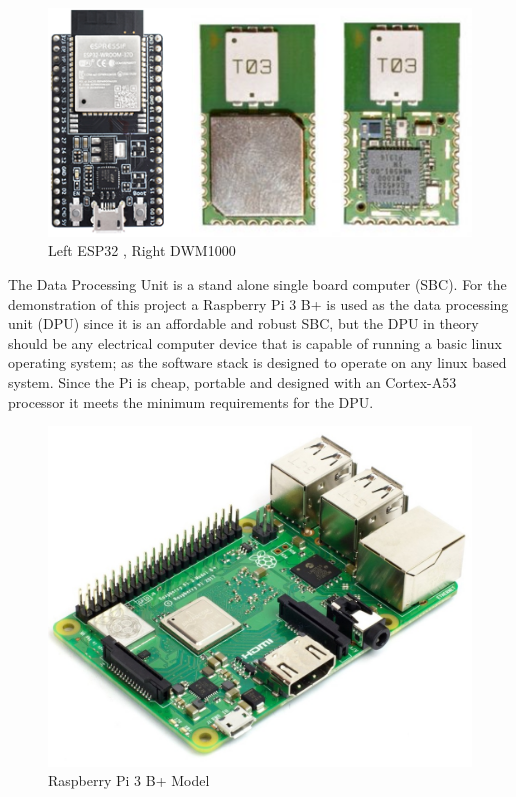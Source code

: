 \medskip
\begin{figure}[H]
\centering
    \includegraphics[scale=0.75]{./images/dwm_esp.png}
    \caption{Left ESP32 \cite{R2-1-1-2}, Right DWM1000}
    \label{dwm_esp}
\end{figure}

The Data Processing Unit is a stand alone single board computer (\Gls{SBC}). For the demonstration of this project a Raspberry Pi 3 B+ is used as the data processing unit (\Gls{DPU}) since it is an affordable and robust SBC, but the DPU in theory should be any electrical computer device that is capable of running a basic linux operating system; as the software stack is designed to operate on any linux based system. Since the Pi is cheap, portable and designed with an Cortex-A53 processor it meets the minimum requirements for the DPU.

\medskip
\begin{figure}[H]
\centering
    \includegraphics[scale=1]{./images/pi.jpg}
    \caption{Raspberry Pi 3 B+ Model \cite{R2-1-1-3}}
    \label{pi}
\end{figure}



